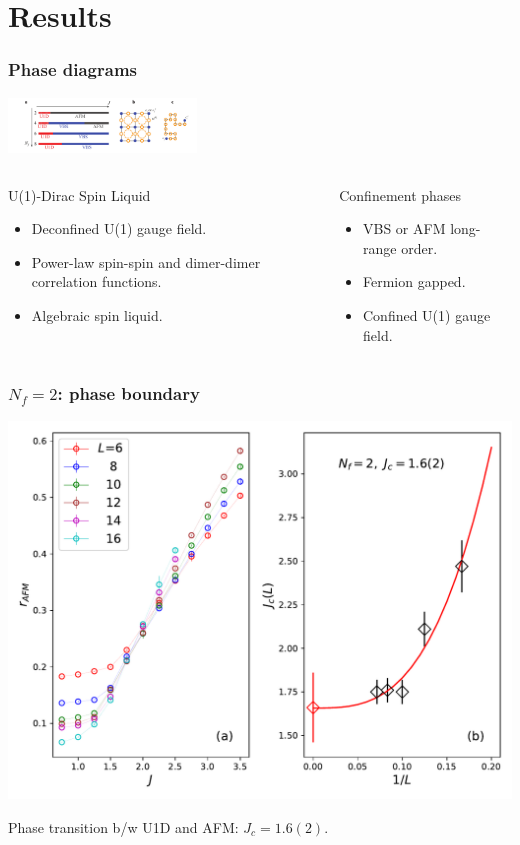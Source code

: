 \documentclass[xcolor=table, 10pt, aspectratio=43]{beamer}
\begin{document}
\section{Results}

\begin{frame}
  \frametitle{Phase diagrams}
  \begin{center}
    \includegraphics[width=5cm]{phase-diagram}
  \end{center}
  \begin{columns}[t]
    \begin{block}{U(1)-Dirac Spin Liquid}
      \begin{itemize}
        \item Deconfined U(1) gauge field.
        \item Power-law spin-spin and dimer-dimer correlation functions.
        \item Algebraic spin liquid.
      \end{itemize}
    \end{block}

    \begin{block}{Confinement phases}
      \begin{itemize}
        \item VBS or AFM long-range order.
        \item Fermion gapped.
        \item Confined U(1) gauge field.
      \end{itemize}
    \end{block}
  \end{columns}
\end{frame}

\begin{frame}
  \frametitle{$N_f=2$: phase boundary}
  \begin{center}
    \includegraphics[width=.8\textwidth]{n2rafm}
  \end{center}
  Phase transition b/w U1D and AFM: $J_c=1.6(2)$.
\end{frame}
\end{document}
